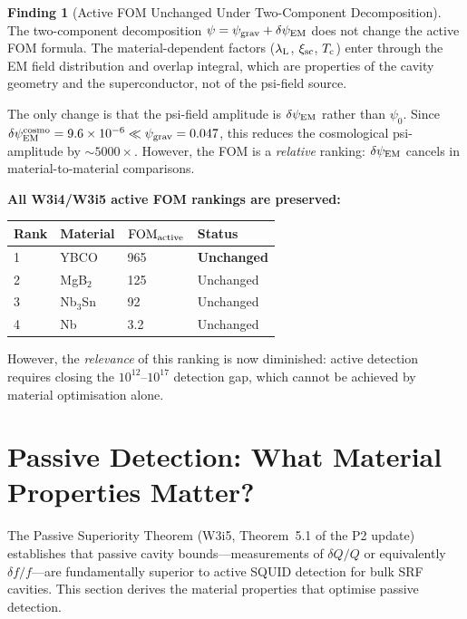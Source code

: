 \documentclass[11pt]{article}
\theoremstyle{definition}
\newtheorem{finding}[theorem]{Finding}
\theoremstyle{remark}
\newcommand{\ee}[1]{\times 10^{#1}}
\newcommand{\psigrav}{\psi_{\rm grav}}
\newcommand{\psiEM}{\delta\psi_{\rm EM}}
\newcommand{\Tc}{T_{\rm c}}
\newcommand{\lambdaL}{\lambda_{\rm L}}
\newcommand{\FOMactive}{\mathrm{FOM}_{\rm active}}
\begin{document}
\begin{finding}[Active FOM Unchanged Under Two-Component Decomposition]
\label{find:active_fom_unchanged}
The two-component decomposition $\psi = \psigrav + \psiEM$ does not
change the active FOM formula. The material-dependent factors
($\lambdaL$, $\xi_{\rm sc}$, $\Tc$) enter through the EM field
distribution and overlap integral, which are properties of the cavity
geometry and the superconductor, not of the psi-field source.

The only change is that the psi-field amplitude is $\psiEM$ rather than
$\psi_0$. Since $\psiEM^{\rm cosmo} = 9.6\ee{-6} \ll \psigrav = 0.047$,
this reduces the cosmological psi-amplitude by $\sim 5000\times$.
However, the FOM is a \emph{relative} ranking: $\psiEM$ cancels in
material-to-material comparisons.

\textbf{All W3i4/W3i5 active FOM rankings are preserved:}
\begin{center}
\begin{tabular}{llll}
\toprule
Rank & Material & $\FOMactive$ & Status \\
\midrule
1 & YBCO & 965 & \textbf{Unchanged} \\
2 & MgB$_2$ & 125 & Unchanged \\
3 & Nb$_3$Sn & 92 & Unchanged \\
4 & Nb & 3.2 & Unchanged \\
\bottomrule
\end{tabular}
\end{center}

However, the \emph{relevance} of this ranking is now diminished: active
detection requires closing the $10^{12}$--$10^{17}$ detection gap,
which cannot be achieved by material optimisation alone.
\end{finding}


\section{Passive Detection: What Material Properties Matter?}
\label{sec:passive_properties}

The Passive Superiority Theorem (W3i5, Theorem~5.1 of the P2 update)
establishes that passive cavity bounds---measurements of $\delta Q/Q$ or
equivalently $\delta f/f$---are fundamentally superior to active SQUID
detection for bulk SRF cavities. This section derives the material
properties that optimise passive detection.
\end{document}
